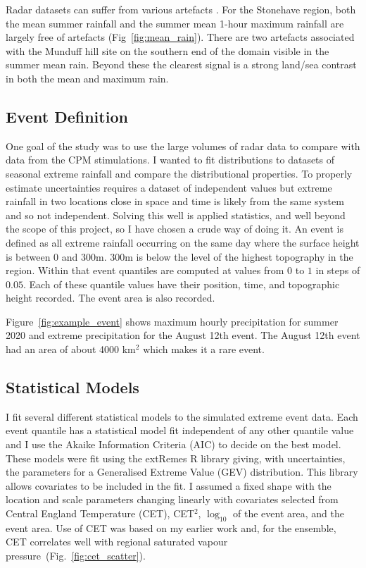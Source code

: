 \documentclass[11pt,a4paper]{article}
\begin{document}
Radar datasets can suffer from various artefacts \parencite{artefacts}.
For the Stonehave region, both the mean summer rainfall and the summer mean 1-hour maximum rainfall are largely free of artefacts (Fig~\ref{fig:mean_rain}). There are two artefacts associated with the Munduff hill site on the southern end of the domain visible in the summer mean rain. Beyond these the clearest signal is a strong land/sea contrast in both the mean and maximum rain. 

\subsection{Event Definition}

One goal of the study was to use the large volumes of radar data to compare with data from the CPM stimulations. I  wanted  to fit distributions to  datasets of seasonal extreme rainfall and compare the distributional properties. To properly estimate uncertainties requires a dataset of independent values but extreme rainfall in two locations close in space and time is likely from the same system and so not independent. Solving this  well is applied statistics, and well beyond the scope of this project, so I have chosen a crude way of doing it.  An event is defined as all extreme rainfall occurring on the same day where the surface height is between 0 and 300m. 300m is below the level of the highest topography in the region. Within that event quantiles are computed at values from $0$ to $1$ in steps of $0.05$. Each of these quantile values have their position, time, and topographic height recorded. The event area is also recorded. 

Figure~\ref{fig:example_event} shows maximum hourly precipitation for summer 2020 and  extreme precipitation for the August 12th event. The August 12th event had an area of about 4000 km$^2$ which makes it a rare event. 


\subsection{Statistical Models}

I fit several different statistical models to the simulated  extreme event data. Each event quantile has a  statistical model fit independent of any other quantile value and I use the Akaike Information Criteria (AIC) to decide on the best model\parencite{akaike74aic}. These models were fit using the extRemes R library\parencite{gilleland2016extremes} giving, with uncertainties, the parameters for a Generalised Extreme Value (GEV) distribution.   This library allows covariates to be included in the fit. I assumed a fixed shape with the location and scale parameters changing linearly with covariates selected from  Central England Temperature (CET), CET$^2$,  $\log_{10}$ of the event area, and the event area.  Use of CET was based on my earlier work\parencite{Tett2023} and, for the ensemble, CET correlates well with regional saturated vapour pressure~(Fig.~\ref{fig:cet_scatter}). 
\end{document}

